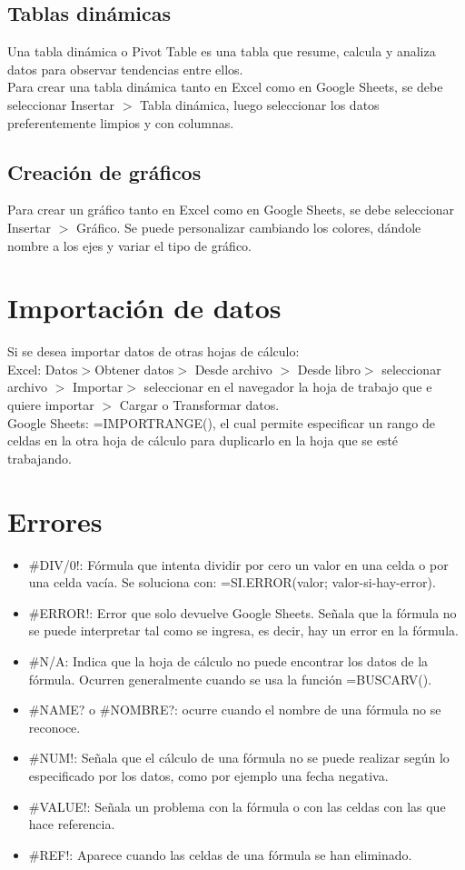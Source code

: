 \documentclass[a4paper, 12pt]{book}
\begin{document}
\subsection{Tablas dinámicas}
Una tabla dinámica o Pivot Table es una tabla que resume, calcula y analiza datos para observar tendencias entre ellos. \\
Para crear una tabla dinámica tanto en Excel como en Google Sheets, se debe seleccionar Insertar $>$ Tabla dinámica, luego seleccionar los datos preferentemente limpios y con columnas.
\subsection{Creación de gráficos}
Para crear un gráfico tanto en Excel como en Google Sheets, se debe seleccionar Insertar $>$ Gráfico. Se puede personalizar cambiando los colores, dándole nombre a los ejes y variar el tipo de gráfico.
\section{Importación de datos}
Si se desea importar datos de otras hojas de cálculo: \\
Excel: Datos$>$Obtener datos$>$ Desde archivo $>$ Desde libro$>$ seleccionar archivo $>$ Importar$>$ seleccionar en el navegador la hoja de trabajo que e quiere importar $>$ Cargar o Transformar datos. \\
Google Sheets: =IMPORTRANGE(), el cual permite especificar un rango de celdas en la otra hoja de cálculo para duplicarlo en la hoja que se esté trabajando.
\section{Errores}
\begin{itemize}
\item $\#$DIV/0!: Fórmula que intenta dividir por cero un valor en una celda o por una celda vacía. Se soluciona con: =SI.ERROR(valor; valor-si-hay-error).
\item $\#$ERROR!: Error que solo devuelve Google Sheets. Señala que la fórmula no se puede interpretar tal como se ingresa, es decir, hay un error en la fórmula.
\item $\#$N/A: Indica que la hoja de cálculo no puede encontrar los datos de la fórmula. Ocurren generalmente cuando se usa la función =BUSCARV().
\item $\#$NAME? o $\#$NOMBRE?: ocurre cuando el nombre de una fórmula no se reconoce.
\item $\#$NUM!: Señala que el cálculo de una fórmula no se puede realizar según lo especificado por los datos, como por ejemplo una fecha negativa.
\item $\#$VALUE!: Señala un problema con la fórmula o con las celdas con las que hace referencia.
\item $\#$REF!: Aparece cuando las celdas de una fórmula se han eliminado.
\end{itemize}
%
\end{document}
